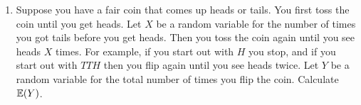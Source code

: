 \documentclass[11pt]{article}
\let\originalleft\left
\let\originalright\right
\renewcommand{\left}{\mathopen{}\mathclose\bgroup\originalleft}
\renewcommand{\right}{\aftergroup\egroup\originalright}
\newcommand{\ex}[2]{{\ifx&#1& \mathbb{E} \else \underset{#1}{\mathbb{E}} \fi \left(#2\right)}}
\theoremstyle{definition}
\begin{document}
\begin{enumerate}[leftmargin=0pt, itemsep=3ex]
\begin{enumerate}[leftmargin=0pt, itemsep=3ex]
        \item Suppose you have a fair coin that comes up heads or tails.  You first toss the coin until you get heads.  Let $X$ be a random variable for the number of times you got tails before you get heads.  Then you toss the coin again until you see heads $X$ times.  For example, if you start out with $H$ you stop, and if you start out with $TTH$ then you flip again until you see heads twice.  Let $Y$ be a random variable for the total number of times you flip the coin.  Calculate $\ex{}{Y}$.
    \end{enumerate}
\end{enumerate}
\end{document}
